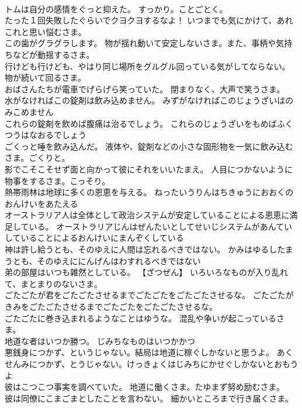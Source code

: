 \documentclass[8pt]{extreport}
\begin{document}
\begin{CJK}{UTF8}{min}
\\	トムは自分の感情をぐっと抑えた。	すっかり。ことごとく。
\\	たった１回失敗したぐらいでクヨクヨするなよ！	いつまでも気にかけて、あれこれと思い悩むさま。
\\	この歯がグラグラします。	物が揺れ動いて安定しないさま。また、事柄や気持ちなどが動揺するさま。
\\	行けども行けども、やはり同じ場所をグルグル回っている気がしてならない。	物が続いて回るさま。
\\	おばさんたちが電車でげらげら笑っていた。	閉まりなく、大声で笑うさま。
\\	水がなければこの錠剤は飲み込めません。	みずがなければこのじょうざいはのみこめません 
\\	これらの錠剤を飲めば腹痛は治るでしょう。	これらのじょうざいをもめばふくつうはなおるでしょう 
\\	ごくっと唾を飲み込んだ。	液体や、錠剤などの小さな固形物を一気に飲み込むさま。ごくりと。
\\	影でこそこそせず面と向かって彼にそれをいいたまえ。	人目につかないように物事をするさま。こっそり。
\\	熱帯雨林は地球に多くの恩恵を与える。	ねったいうりんはちきゅうにおおくのおんけいをあたえる 
\\	オーストラリア人は全体として政治システムが安定していることによる恩恵に満足している。	オーストラリアじんはぜんたいとしてせいじシステムがあんていしていることによるおんけいにまんぞくしている 
\\	神は許し給うとも、そのゆえに人間は忘れるべきではない。	かみはゆるしたまうとも、そのゆえににんげんはわすれるべきではない 
\\	弟の部屋はいつも雑然としている。	【ざつぜん】 いろいろなものが入り乱れて、まとまりのないさま。
\\	ごたごたが君をごたごたさせるまでごたごたをごたごたさせるな。	ごたごたがきみをごたごたさせるまでごたごたをごたごたさせるな。 
\\	ごたごたに巻き込まれるようなことはゆうな。	混乱や争いが起こっているさま。
\\	地道な者はいつか勝つ。	じみちなものはいつかかつ 
\\	悪銭身につかず、というじゃない。結局は地道に稼ぐしかないと思うよ。	あくせんみにつかず、とうじゃない。けっきょくはじみちにかせぐしかないとおもうよ 
\\	彼はこつこつ事実を調べていた。	地道に働くさま。たゆまず努め励むさま。
\\	彼は同僚にこまごまとしたことを言わない。	細かいところまで行き届くさま。

\end{CJK}
\end{document}
